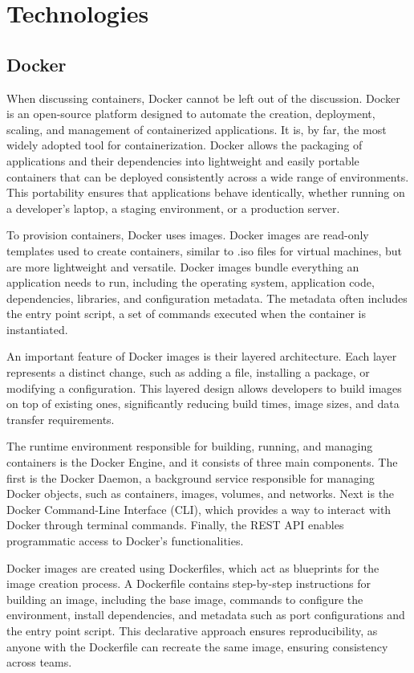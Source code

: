\chapter{Technologies} \label{ch:technologies}

\section{Docker}
When discussing containers, Docker cannot be left out of the discussion. Docker is an open-source platform designed to automate the creation, deployment, scaling, and management of containerized applications. It is, by far, the most widely adopted tool for containerization. Docker allows the packaging of applications and their dependencies into lightweight and easily portable containers that can be deployed consistently across a wide range of environments. This portability ensures that applications behave identically, whether running on a developer's laptop, a staging environment, or a production server.

To provision containers, Docker uses images. Docker images are read-only templates used to create containers, similar to .iso files for virtual machines, but are more lightweight and versatile. Docker images bundle everything an application needs to run, including the operating system, application code, dependencies, libraries, and configuration metadata. The metadata often includes the entry point script, a set of commands executed when the container is instantiated.

An important feature of Docker images is their layered architecture. Each layer represents a distinct change, such as adding a file, installing a package, or modifying a configuration. This layered design allows developers to build images on top of existing ones, significantly reducing build times, image sizes, and data transfer requirements.

The runtime environment responsible for building, running, and managing containers is the Docker Engine, and it consists of three main components. The first is the Docker Daemon, a background service responsible for managing Docker objects, such as containers, images, volumes, and networks. Next is the Docker Command-Line Interface (CLI), which provides a way to interact with Docker through terminal commands. Finally, the REST API enables programmatic access to Docker's functionalities.

Docker images are created using Dockerfiles, which act as blueprints for the image creation process. A Dockerfile contains step-by-step instructions for building an image, including the base image, commands to configure the environment, install dependencies, and metadata such as port configurations and the entry point script. This declarative approach ensures reproducibility, as anyone with the Dockerfile can recreate the same image, ensuring consistency across teams.

